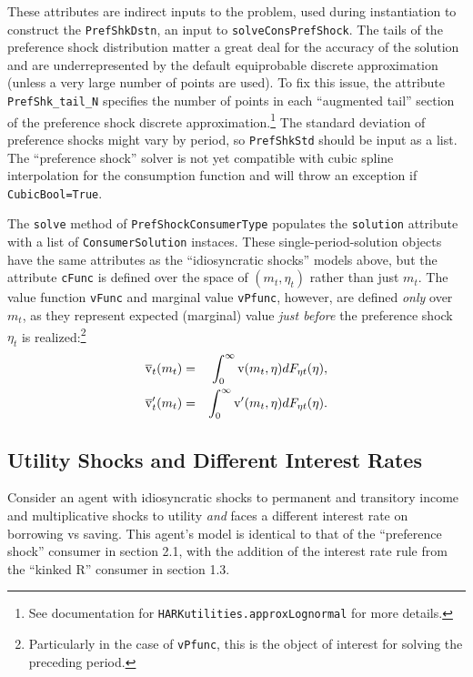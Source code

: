 \documentclass[12pt,titlepage,letterpaper]{econtex}
\begin{document}
These attributes are indirect inputs to the problem, used during instantiation to construct the \texttt{PrefShkDstn}, an input to \texttt{solveConsPrefShock}.  The tails of the preference shock distribution matter a great deal for the accuracy of the solution and are underrepresented by the default equiprobable discrete approximation (unless a very large number of points are used).  To fix this issue, the attribute \texttt{PrefShk\_tail\_N} specifies the number of points in each ``augmented tail'' section of the preference shock discrete approximation.\footnote{See documentation for \texttt{HARKutilities.approxLognormal} for more details.}  The standard deviation of preference shocks might vary by period, so \texttt{PrefShkStd} should be input as a list.  The ``preference shock'' solver is not yet compatible with cubic spline interpolation for the consumption function and will throw an exception if \texttt{CubicBool=True}.

The \texttt{solve} method of \texttt{PrefShockConsumerType} populates the \texttt{solution} attribute with a list of \texttt{ConsumerSolution} instaces.  These single-period-solution objects have the same attributes as the ``idiosyncratic shocks'' models above, but the attribute \texttt{cFunc} is defined over the space of $(m_t,\eta_t)$ rather than just $m_t$.  The value function \texttt{vFunc} and marginal value \texttt{vPfunc}, however, are defined \textit{only} over $m_t$, as they represent expected (marginal) value \textit{just before} the preference shock $\eta_t$ is realized:\footnote{Particularly in the case of \texttt{vPfunc}, this is the object of interest for solving the preceding period.}
\begin{eqnarray*}
\overline{\mathrm{v}}_t(m_t) &=& \int_0^\infty \mathrm{v}(m_t,\eta)dF_{\eta t}(\eta), \\
\overline{\mathrm{v}}_t'(m_t) &=& \int_0^\infty \mathrm{v}'(m_t,\eta)dF_{\eta t}(\eta).
\end{eqnarray*}


\subsection{Utility Shocks and Different Interest Rates}

Consider an agent with idiosyncratic shocks to permanent and transitory income and multiplicative shocks to utility \textit{and} faces a different interest rate on borrowing vs saving.  This agent's model is identical to that of the ``preference shock'' consumer in section 2.1, with the addition of the interest rate rule from the ``kinked R'' consumer in section 1.3.
\end{document}

